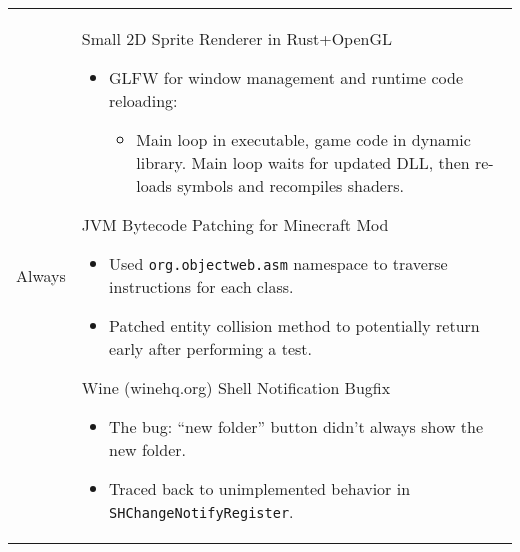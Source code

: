 \documentclass[11pt]{article}
\newenvironment{timeline}
        {\begin{tabular}{p{21 mm}|p{150 mm}}}
        {\end{tabular}}
\newenvironment{timelinetitle}
        {\vspace{-2 mm}\begin{large}}
        {\end{large}\vspace{-1.5 mm}}
\newcommand{\timespan}[2]{{#2}\newline{#1}}
\begin{document}
\begin{timeline}
\timespan{2011}{Always}
&
\begin{timelinetitle}
    Small 2D Sprite Renderer in Rust+OpenGL
\end{timelinetitle}
\begin{itemize}
  \item[] GLFW for window management and runtime code reloading:
    \begin{itemize}
      \item Main loop in executable, game code in dynamic library. Main loop waits for updated DLL, then re-loads symbols and recompiles shaders.
    \end{itemize}
\end{itemize}

\vspace{0.5cm}

\begin{timelinetitle}
    JVM Bytecode Patching for Minecraft Mod
\end{timelinetitle}
\begin{itemize}
  \item[] Used \texttt{org.objectweb.asm} namespace to traverse instructions for each class.
  \item[] Patched entity collision method to potentially return early after performing a test.
\end{itemize}

\vspace{0.5cm}

\begin{timelinetitle}
    Wine (winehq.org) Shell Notification Bugfix
\end{timelinetitle}
\begin{itemize}
  \item[] The bug: ``new folder'' button didn't always show the new folder.
  \item[] Traced back to unimplemented behavior in \texttt{SHChangeNotifyRegister}.
\end{itemize}

\end{timeline}

\vspace{3.0 mm}
\end{document}
